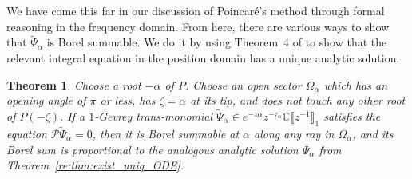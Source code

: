 \documentclass{article}
\newcommand{\C}{\mathbb{C}}
\newcommand{\series}[1]{\tilde{#1}}
\theoremstyle{definition}
\theoremstyle{plain}
\newtheorem{theorem}{Theorem}[section]
\begin{document}
We have come this far in our discussion of Poincar\'{e}'s method through formal reasoning in the frequency domain. From here, there are various ways to show that $\series{\Psi}_\alpha$ is Borel summable. We do it by using Theorem~4 of \cite{reg-sing-volterra} to show that the relevant integral equation in the position domain has a unique analytic solution.
\begin{theorem}\label{thm:summability_ODE}
Choose a root $-\alpha$ of $P$. Choose an open sector $\Omega_\alpha$ which has an opening angle of $\pi$ or less, has $\zeta = \alpha$ at its tip, and does not touch any other root of $P(-\zeta)$. If a $1$-Gevrey trans-monomial $\series{\Psi}_\alpha \in e^{-z\alpha} z^{-\tau_\alpha}\C\llbracket z^{-1} \rrbracket_1$ satisfies the equation $\mathcal{P} \series{\Psi}_\alpha = 0$, then it is Borel summable at $\alpha$ along any ray in $\Omega_\alpha$, and its Borel sum is proportional to the analogous analytic solution $\Psi_\alpha$ from Theorem~\ref{re:thm:exist_uniq_ODE}.
\end{theorem}
\end{document}
